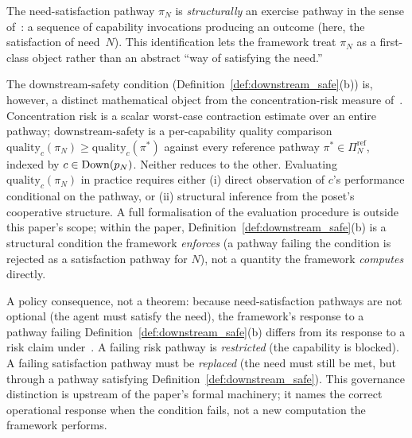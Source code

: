 \begin{remark}
\label{rem:exercise_pathway}
The need-satisfaction pathway $\pi_N$ is \emph{structurally} an
exercise pathway in the sense
of~\citep[Definition~2]{lasser2026horizon}: a sequence of
capability invocations producing an outcome (here, the
satisfaction of need~$N$).  This identification lets the framework
treat $\pi_N$ as a first-class object rather than an abstract
``way of satisfying the need.''

The downstream-safety condition
(Definition~\ref{def:downstream_safe}(b)) is, however, a distinct
mathematical object from the concentration-risk measure
of~\citep[Definition~3]{lasser2026horizon}.  Concentration risk
is a scalar worst-case contraction estimate over an entire
pathway; downstream-safety is a per-capability quality
comparison $\mathrm{quality}_c(\pi_N) \geq \mathrm{quality}_c(\pi^*)$
against every reference pathway $\pi^* \in \Pi_N^{\mathrm{ref}}$,
indexed by $c \in \mathrm{Down}(p_N)$.  Neither reduces to the other.
Evaluating $\mathrm{quality}_c(\pi_N)$ in practice requires
either (i) direct observation of $c$'s performance conditional on
the pathway, or (ii) structural inference from the poset's
cooperative structure.  A full formalisation of the evaluation
procedure is outside this paper's scope; within the paper,
Definition~\ref{def:downstream_safe}(b) is a structural condition
the framework \emph{enforces} (a pathway failing the condition is
rejected as a satisfaction pathway for $N$), not a quantity the
framework \emph{computes} directly.

A policy consequence, not a theorem: because need-satisfaction
pathways are not optional (the agent must satisfy the need), the
framework's response to a pathway failing
Definition~\ref{def:downstream_safe}(b) differs from its response
to a risk claim under~\citep{lasser2026wamura}.  A failing risk
pathway is \emph{restricted} (the capability is blocked).  A
failing satisfaction pathway must be \emph{replaced} (the need
must still be met, but through a pathway satisfying
Definition~\ref{def:downstream_safe}).  This governance
distinction is upstream of the paper's formal machinery; it names
the correct operational response when the condition fails, not a
new computation the framework performs.
\end{remark}

